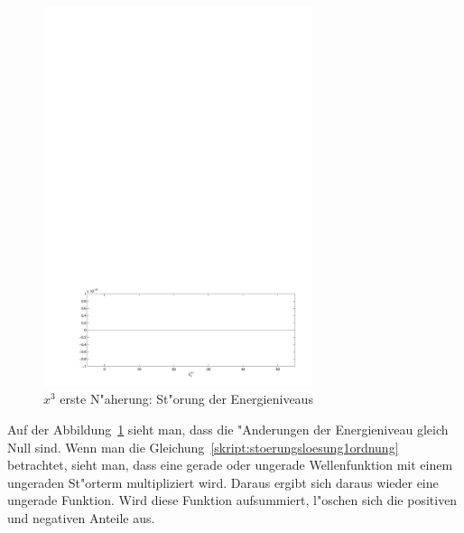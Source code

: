 \begin{refsection}
\begin{figure}	%
\centering
\includegraphics[width=0.7\textwidth]{anharmonisch/images/x3/EK1.pdf}
\caption{$x^3$ erste N"aherung: St"orung der Energieniveaus  
\label{skript:x3_EK1}}
\end{figure}

Auf der Abbildung~\ref{skript:x3_EK1} sieht man, dass die "Anderungen
der Energieniveau gleich Null sind.
Wenn man die Gleichung~\ref{skript:stoerungsloesung1ordnung} betrachtet,
sieht man, dass eine gerade oder ungerade Wellenfunktion mit einem ungeraden
St"orterm multipliziert wird.
Daraus ergibt sich daraus wieder eine ungerade Funktion.
Wird diese Funktion aufsummiert,
l"oschen sich die positiven und negativen Anteile aus.


\end{refsection}
